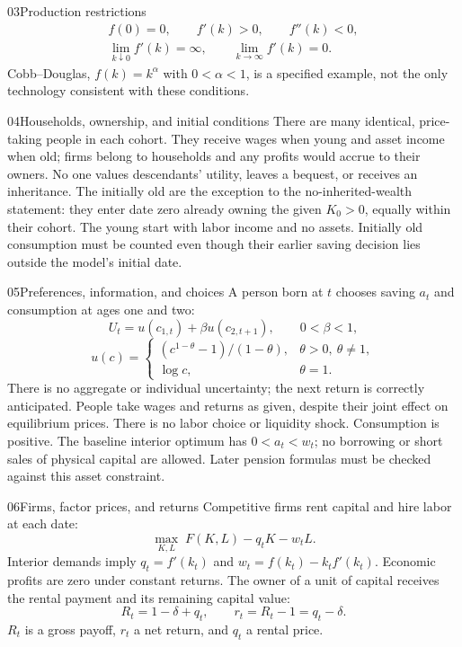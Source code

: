 \begin{modelsetup}[1]
\begin{modelcondition}{03}{Production restrictions}
\[\begin{gathered}
f(0)=0,\qquad f'(k)>0,\qquad f''(k)<0,\\
\lim_{k\downarrow0}f'(k)=\infty,\qquad
\lim_{k\to\infty}f'(k)=0.
\end{gathered}
\]
Cobb--Douglas, $f(k)=k^\alpha$ with $0<\alpha<1$, is a specified example,
not the only technology consistent with these conditions.
\end{modelcondition}
\begin{modelcondition}{04}{Households, ownership, and initial conditions}
There are many identical, price-taking people in each cohort. They receive
wages when young and asset income when old; firms belong to households and
any profits would accrue to their owners. No one values descendants' utility,
leaves a bequest, or receives an inheritance. The initially old are the
exception to the no-inherited-wealth statement: they enter date zero already
owning the given $K_0>0$, equally within their cohort. The young start with
labor income and no assets. Initially old consumption must be counted even
though their earlier saving decision lies outside the model's initial date.
\end{modelcondition}
\begin{modelcondition}{05}{Preferences, information, and choices}
A person born at $t$ chooses saving $a_t$ and consumption at ages one and two:
\[
U_t=u(c_{1,t})+\beta u(c_{2,t+1}),\qquad 0<\beta<1,
\]
\[
u(c)=\begin{cases}(c^{1-\theta}-1)/(1-\theta),&\theta>0,\ \theta\ne1,\\
\log c,&\theta=1.
\end{cases}
\]
There is no aggregate or individual uncertainty; the next return is correctly
anticipated. People take wages and returns as given, despite their joint
effect on equilibrium prices. There is no labor choice or liquidity shock.
Consumption is positive. The baseline interior optimum has $0<a_t<w_t$;
no borrowing or short sales of physical capital are allowed. Later pension
formulas must be checked against this asset constraint.
\end{modelcondition}
\begin{modelcondition}{06}{Firms, factor prices, and returns}
Competitive firms rent capital and hire labor at each date:
\[
\max_{K,L}\;F(K,L)-q_tK-w_tL.
\]
Interior demands imply $q_t=f'(k_t)$ and $w_t=f(k_t)-k_tf'(k_t)$.
Economic profits are zero under constant returns. The owner of a unit of
capital receives the rental payment and its remaining capital value:
\[
R_t=1-\delta+q_t,\qquad r_t=R_t-1=q_t-\delta.
\]
$R_t$ is a gross payoff, $r_t$ a net return, and $q_t$ a rental price.

\end{modelcondition}
\end{modelsetup}
